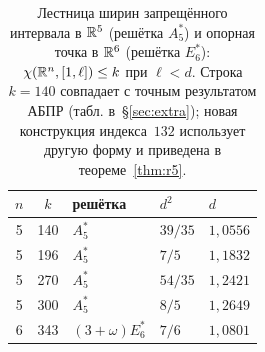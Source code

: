 \begin{table}[h]
\centering
\caption{Лестница ширин запрещённого интервала в $\mathbb{R}^5$ (решётка $A_5^*$) и
опорная точка в $\mathbb{R}^6$ (решётка $E_6^*$): $\chi(\mathbb{R}^n,[1,\ell])\le k$ при
$\ell<d$. Строка $k=140$ совпадает с точным результатом АБПР (табл. в~\S\ref{sec:extra}); новая конструкция индекса~$132$ использует другую форму и
приведена в теореме~\ref{thm:r5}.}
\label{tab:stair56}
\small
\begin{tabular}{c c l l l}
\toprule
$n$ & $k$ & решётка & $d^2$ & $d$\\
\midrule
5 & 140 & $A_5^*$ & $39/35$ & $1{,}0556$\\
5 & 196 & $A_5^*$ & $7/5$   & $1{,}1832$\\
5 & 270 & $A_5^*$ & $54/35$ & $1{,}2421$\\
5 & 300 & $A_5^*$ & $8/5$   & $1{,}2649$\\
6 & 343 & $(3+\omega)E_6^*$ & $7/6$ & $1{,}0801$\\
\bottomrule
\end{tabular}
\end{table}


